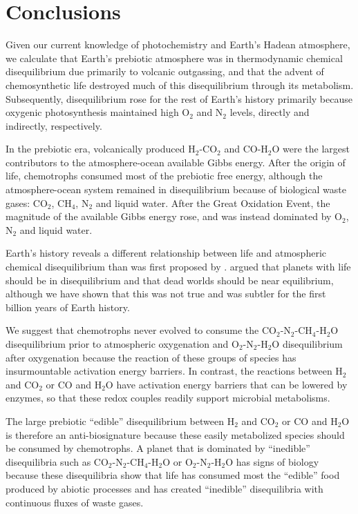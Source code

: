 \section{Conclusions}

Given our current knowledge of photochemistry and Earth's Hadean atmosphere, we calculate that Earth's prebiotic atmosphere was in thermodynamic chemical disequilibrium due primarily to volcanic outgassing, and that the advent of chemosynthetic life destroyed much of this disequilibrium through its metabolism. Subsequently, disequilibrium rose for the rest of Earth's history primarily because oxygenic photosynthesis maintained high O$_2$ and N$_2$ levels, directly and indirectly, respectively.

In the prebiotic era, volcanically produced H$_2$-CO$_2$ and CO-H$_2$O were the largest contributors to the atmosphere-ocean available Gibbs energy. After the origin of life, chemotrophs consumed most of the prebiotic free energy, although the atmosphere-ocean system remained in disequilibrium because of biological waste gases: CO$_2$, CH$_4$, N$_2$ and liquid water. After the Great Oxidation Event, the magnitude of the available Gibbs energy rose, and was instead dominated by O$_2$, N$_2$ and liquid water.

Earth's history reveals a different relationship between life and atmospheric chemical disequilibrium than was first proposed by \citet{Lovelock_1965}. \citet{Lovelock_1965} argued that planets with life should be in disequilibrium and that dead worlds should be near equilibrium, although we have shown that this was not true and was subtler for the first billion years of Earth history.

We suggest that chemotrophs never evolved to consume the CO$_2$-N$_2$-CH$_4$-H$_2$O disequilibrium prior to atmospheric oxygenation and O$_2$-N$_2$-H$_2$O disequilibrium after oxygenation because the reaction of these groups of species has insurmountable activation energy barriers. In contrast, the reactions between H$_2$ and CO$_2$ or CO and H$_2$O have activation energy barriers that can be lowered by enzymes, so that these redox couples readily support microbial metabolisms.

The large prebiotic ``edible'' disequilibrium between H$_2$ and CO$_2$ or CO and H$_2$O is therefore an anti-biosignature because these easily metabolized species should be consumed by chemotrophs. A planet that is dominated by ``inedible'' disequilibria such as CO$_2$-N$_2$-CH$_4$-H$_2$O or O$_2$-N$_2$-H$_2$O has signs of biology because these disequilibria show that life has consumed most the ``edible'' food produced by abiotic processes and has created ``inedible'' disequilibria with continuous fluxes of waste gases.

